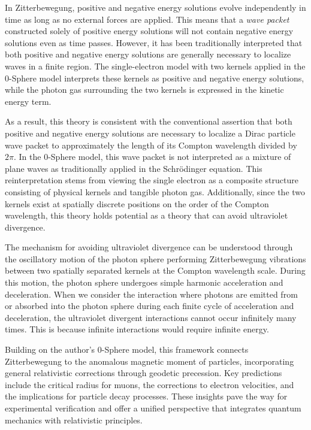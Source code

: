 \documentclass[%
 reprint,
 amsmath,amssymb,
 aps,
]{revtex4-1}
\numberwithin{equation}{section}%
\begin{document}
In Zitterbewegung, positive and negative energy solutions evolve independently in time as long as no external forces are applied. This means that a \textit{wave packet} constructed solely of positive energy solutions will not contain negative energy solutions even as time passes. However, it has been traditionally interpreted that both positive and negative energy solutions are generally necessary to localize waves in a finite region. The single-electron model with two kernels applied in the 0-Sphere model interprets these kernels as positive and negative energy solutions, while the photon gas surrounding the two kernels is expressed in the kinetic energy term.

As a result, this theory is consistent with the conventional assertion that both positive and negative energy solutions are necessary to localize a Dirac particle wave packet to approximately the length of its Compton wavelength divided by $2\pi$. In the 0-Sphere model, this wave packet is not interpreted as a mixture of plane waves as traditionally applied in the Schrödinger equation. This reinterpretation stems from viewing the single electron as a composite structure consisting of physical kernels and tangible photon gas. Additionally, since the two kernels exist at spatially discrete positions on the order of the Compton wavelength, this theory holds potential as a theory that can avoid ultraviolet divergence.

The mechanism for avoiding ultraviolet divergence can be understood through the oscillatory motion of the photon sphere performing Zitterbewegung vibrations between two spatially separated kernels at the Compton wavelength scale. During this motion, the photon sphere undergoes simple harmonic acceleration and deceleration. When we consider the interaction where photons are emitted from or absorbed into the photon sphere during each finite cycle of acceleration and deceleration, the ultraviolet divergent interactions cannot occur infinitely many times. This is because infinite interactions would require infinite energy.

Building on the author's 0-Sphere model, this framework connects Zitterbewegung to the anomalous magnetic moment of particles, incorporating general relativistic corrections through geodetic precession. Key predictions include the critical radius for muons, the corrections to electron velocities, and the implications for particle decay processes. These insights pave the way for experimental verification and offer a unified perspective that integrates quantum mechanics with relativistic principles.
\end{document}
